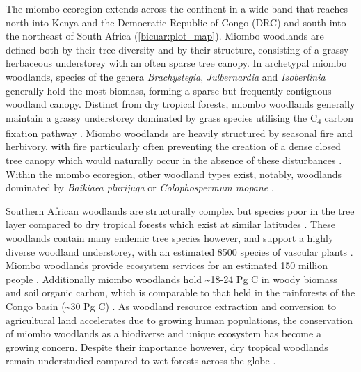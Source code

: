 \begin{refsection}
The miombo ecoregion extends across the continent in a wide band that reaches north into Kenya and the Democratic Republic of Congo (DRC) and south into the northeast of South Africa (\autoref{bicuar:plot_map}). Miombo woodlands are defined both by their tree diversity and by their structure, consisting of a grassy herbaceous understorey with an often sparse tree canopy. In archetypal miombo woodlands, species of the genera \textit{Brachystegia}, \textit{Julbernardia} and \textit{Isoberlinia} generally hold the most biomass, forming a sparse but frequently contiguous woodland canopy. Distinct from dry tropical forests, miombo woodlands generally maintain a grassy understorey dominated by grass species utilising the C\textsubscript{4} carbon fixation pathway \citep{Dexter2015}. Miombo woodlands are heavily structured by seasonal fire and herbivory, with fire particularly often preventing the creation of a dense closed tree canopy which would naturally occur in the absence of these disturbances \citep{Oliveras2016, Dantas2016}. Within the miombo ecoregion, other woodland types exist, notably, woodlands dominated by \textit{Baikiaea plurijuga} or \textit{Colophospermum mopane} \citep{Campbell2002}.

Southern African woodlands are structurally complex but species poor in the tree layer compared to dry tropical forests which exist at similar latitudes \citep{DRYFLOR2016, Torello2013}. These woodlands contain many endemic tree species however, and support a highly diverse woodland understorey, with an estimated 8500 species of vascular plants \citep{Frost1996}. Miombo woodlands provide ecosystem services for an estimated 150 million people \citep{Ryan2016}. Additionally miombo woodlands hold \textasciitilde{}18-24 Pg C in woody biomass and soil organic carbon, which is comparable to that held in the rainforests of the Congo basin (\textasciitilde{}30 Pg C) \citep{Mayaux2008}. As woodland resource extraction and conversion to agricultural land accelerates due to growing human populations, the conservation of miombo woodlands as a biodiverse and unique ecosystem has become a growing concern. Despite their importance however, dry tropical woodlands remain understudied compared to wet forests across the globe \citep{Clarke2017}. 


\end{refsection}
